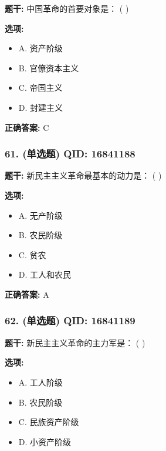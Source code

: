 \documentclass[12pt,UTF8]{ctexart}
\begin{document}
\textbf{题干:}
中国革命的首要对象是： ( )

\textbf{选项:}
\begin{itemize}[leftmargin=*]

  \item A. 资产阶级

  \item B. 官僚资本主义

  \item C. 帝国主义

  \item D. 封建主义

\end{itemize}

\textbf{正确答案:}
C

\vspace{0.3em}\hrulefill\vspace{0.7em}

\subsubsection*{61. (单选题) \small QID: 16841188}

\textbf{题干:}
新民主主义革命最基本的动力是： ( )

\textbf{选项:}
\begin{itemize}[leftmargin=*]

  \item A. 无产阶级

  \item B. 农民阶级

  \item C. 贫农

  \item D. 工人和农民

\end{itemize}

\textbf{正确答案:}
A

\vspace{0.3em}\hrulefill\vspace{0.7em}

\subsubsection*{62. (单选题) \small QID: 16841189}

\textbf{题干:}
新民主主义革命的主力军是： ( )

\textbf{选项:}
\begin{itemize}[leftmargin=*]

  \item A. 工人阶级

  \item B. 农民阶级

  \item C. 民族资产阶级

  \item D. 小资产阶级

\end{itemize}
\end{document}

